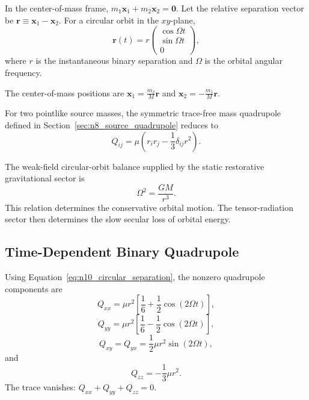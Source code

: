 In the center-of-mass frame, $m_{1}\mathbf{x}_{1} + m_{2}\mathbf{x}_{2} = \mathbf{0}$. Let the relative separation vector be $\mathbf{r} \equiv \mathbf{x}_{1} - \mathbf{x}_{2}$. For a circular orbit in the $xy$-plane,
\begin{equation}
    \mathbf{r}(t) = r
    \begin{pmatrix}
        \cos\Omega t \\
        \sin\Omega t \\
        0
    \end{pmatrix},
    \label{eq:n10_circular_separation}
\end{equation}
where $r$ is the instantaneous binary separation and $\Omega$ is the orbital angular frequency.

The center-of-mass positions are $\mathbf{x}_{1} = \frac{m_{2}}{M}\mathbf{r}$ and $\mathbf{x}_{2} = - \frac{m_{1}}{M}\mathbf{r}$.

For two pointlike source masses, the symmetric trace-free mass quadrupole defined in Section~\ref{sec:n8_source_quadrupole} reduces to
\begin{equation}
    Q_{ij} = \mu \left( r_{i}r_{j} - \frac{1}{3} \delta_{ij}r^{2} \right).
    \label{eq:n10_binary_quadrupole}
\end{equation}

The weak-field circular-orbit balance supplied by the static restorative gravitational sector is
\begin{equation}
    \Omega^{2} = \frac{GM}{r^{3}}.
    \label{eq:n10_kepler_relation}
\end{equation}
This relation determines the conservative orbital motion. The tensor-radiation sector then determines the slow secular loss of orbital energy.

\subsection{Time-Dependent Binary Quadrupole}
\label{subsec:n10_binary_quadrupole}

Using Equation~\eqref{eq:n10_circular_separation}, the nonzero quadrupole components are
\begin{equation}
    Q_{xx} = \mu r^{2} \left[ \frac{1}{6} + \frac{1}{2} \cos(2\Omega t) \right],
    \label{eq:n10_Qxx}
\end{equation}
\begin{equation}
    Q_{yy} = \mu r^{2} \left[ \frac{1}{6} - \frac{1}{2} \cos(2\Omega t) \right],
    \label{eq:n10_Qyy}
\end{equation}
\begin{equation}
    Q_{xy} = Q_{yx} = \frac{1}{2} \mu r^{2} \sin(2\Omega t),
    \label{eq:n10_Qxy}
\end{equation}
and
\begin{equation}
    Q_{zz} = - \frac{1}{3} \mu r^{2}.
    \label{eq:n10_Qzz}
\end{equation}
The trace vanishes: $Q_{xx} + Q_{yy} + Q_{zz} = 0$.

